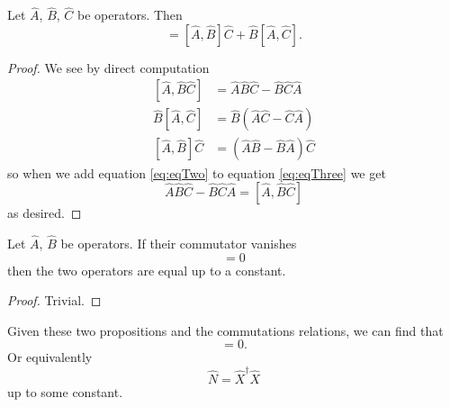 \begin{prop}
Let $\widehat{A}$, $\widehat{B}$, $\widehat{C}$ be
operators. Then
\begin{equation}%
[\widehat{A},\widehat{B}\widehat{C}]=[\widehat{A},\widehat{B}]\widehat{C}+\widehat{B}[\widehat{A},\widehat{C}].
\end{equation}
\end{prop}
\begin{proof}
We see by direct computation
\begin{subequations}
\begin{align}
[\widehat{A},\widehat{B}\widehat{C}]&=\widehat{A}\widehat{B}\widehat{C}-\widehat{B}\widehat{C}\widehat{A}\\
\widehat{B}[\widehat{A},\widehat{C}]&=\widehat{B}(\widehat{A}\widehat{C}-\widehat{C}\widehat{A})
\label{eq:eqTwo}\\
[\widehat{A},\widehat{B}]\widehat{C}&=(\widehat{A}\widehat{B}-\widehat{B}\widehat{A})\widehat{C}\label{eq:eqThree}
\end{align}
\end{subequations}
so when we add equation \eqref{eq:eqTwo} to equation \eqref{eq:eqThree} we get
\begin{equation}%
\widehat{A}\widehat{B}\widehat{C}-\widehat{B}\widehat{C}\widehat{A}
= [\widehat{A},\widehat{B}\widehat{C}]
\end{equation}
as desired.
\end{proof}
\begin{prop}\label{prop:vanishingCommutators}
Let $\widehat{A}$, $\widehat{B}$ be operators. If their
commutator vanishes
\begin{equation}%
[\widehat{A},\widehat{B}] = 0
\end{equation}
then the two operators are equal up to a constant.
\end{prop}
\begin{proof}
Trivial.
\end{proof}
\begin{prop}
Given these two propositions and the commutations relations, we
can find that
\begin{equation}%
[\widehat{N},\widehat{X}\widehat{X}^\dag]=0.
\end{equation}
Or equivalently
\begin{equation}%
\widehat{N}=\widehat{X}^{\dag}\widehat{X}
\end{equation}
up to some constant.
\end{prop}

